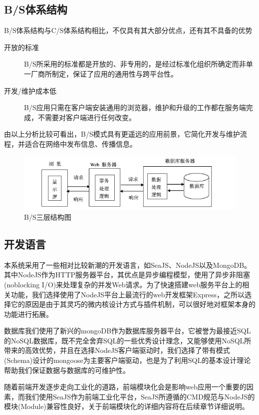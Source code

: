 
\subsection{B/S体系结构}
\indent
B/S体系结构与C/S体系结构相比，不仅具有其大部分优点，还有其不具备的优势
\begin{description}
  \item[开放的标准] B/S所采用的标准都是开放的、非专用的，是经过标准化组织所确定而非单一厂商所制定，保证了应用的通用性与跨平台性。
  \item[开发/维护成本低] B/S应用只需在客户端安装通用的浏览器，维护和升级的工作都在服务端完成，不需要对客户端进行任何改变。
\end{description}
\indent
由以上分析比较可看出，B/S模式具有更遥远的应用前景，它简化开发与维护流程，并适合在网络中发布信息、传播信息。

\begin{figure}[h]
  \centering
    \includegraphics[width=1\textwidth]{./images/bs-graph.png}
  \caption{B/S三层结构图}
\end{figure}

\subsection{开发语言}
\indent
本系统采用了一些相对比较新潮的开发语言，如SeaJS、NodeJS以及MongoDB。其中NodeJS作为HTTP服务器平台，其优点是异步编程模型，使用了异步非阻塞(noblocking I/O)来处理复杂的并发Web请求。为了快速搭建web服务平台上的相关功能，我们选择使用了NodeJS平台上最流行的web开发框架Express，之所以选择它的原因是由于其灵巧的微内核设计方式与插件机制，可以很好地对框架本身的功能进行拓展。

\indent
数据库我们使用了新兴的mongoDB作为数据库服务器平台，它被誉为最接近SQL的NoSQL数据库，既不完全舍弃SQL的一些优秀设计理念，又能够使用NoSQL所带来的高效优势，并且在选择NodeJS客户端驱动时，我们选择了带有模式(Schema)设计的mongoose为主要客户端驱动，也是为了利用SQL的基本设计理论帮助我们保证数据与数据库的可维护性。

\indent
随着前端开发逐步走向工业化的道路，前端模块化会是影响web应用一个重要的因素，而我们使用SeaJS作为前端工业化平台，SeaJS所遵循的CMD规范与NodeJS的模块(Module)兼容性良好，关于前端模块化的详细内容将在后续章节详细说明。

